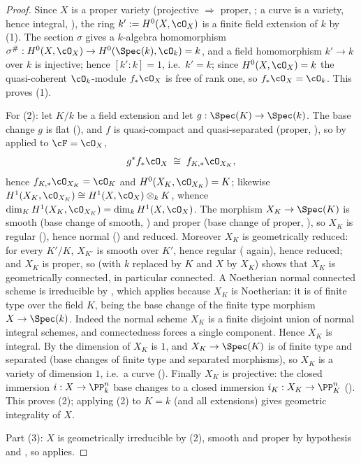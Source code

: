 \begin{proof}
Since $X$ is a proper variety (projective $\Rightarrow$ proper,
; a curve is a variety, hence integral,
), the ring $k':=H^0(X,\cO_X)$ is a finite field
extension of $k$ by  (1).  The section
$\sigma$ gives a $k$-algebra homomorphism $\sigma^\#:H^0(X,\cO_X)\to
H^0(\Spec(k),\cO_k)=k$, and a field homomorphism $k'\to k$ over $k$ is
injective; hence $[k':k]=1$, i.e.\ $k'=k$; since $H^0(X,\cO_X)=k$ the
quasi-coherent $\cO_k$-module $f_*\cO_X$ is free of rank one, so
$f_*\cO_X=\cO_k$.  This proves (1).

For (2): let $K/k$ be a field extension and let
$g:\Spec(K)\to\Spec(k)$.  The base change $g$ is flat
(), and $f$ is quasi-compact and quasi-separated
(proper, ), so by
 applied to $\cF=\cO_X$,
\[
g^*f_*\cO_X\;\cong\;f_{K,*}\cO_{X_K},
\]
hence $f_{K,*}\cO_{X_K}=\cO_K$ and $H^0(X_K,\cO_{X_K})=K$; likewise
$H^1(X_K,\cO_{X_K})\cong H^1(X,\cO_X)\otimes_kK$, whence
$\dim_K H^1(X_K,\cO_{X_K})=\dim_kH^1(X,\cO_X)$.
The morphism $X_K\to\Spec(K)$ is smooth (base change of smooth,
) and proper (base change of proper,
), so $X_K$ is regular
(), hence normal
()
and reduced.  Moreover $X_K$ is geometrically reduced: for every $K'/K$,
$X_{K'}$ is smooth over $K'$, hence regular
( again), hence reduced; and $X_K$ is
proper, so  (with $k$ replaced by $K$ and
$X$ by $X_K$) shows that $X_K$ is geometrically connected, in particular
connected.  A Noetherian normal connected scheme is irreducible by
, which applies because $X_K$ is
Noetherian: it is of finite type over the field $K$, being the base change of
the finite type morphism $X\to\Spec(k)$.  Indeed the normal scheme $X_K$ is a
finite disjoint union of normal integral schemes, and connectedness forces a
single component.  Hence $X_K$ is integral.  By 
the dimension of $X_K$ is $1$, and $X_K\to\Spec(K)$ is of finite type and
separated (base changes of finite type and separated morphisms), so $X_K$
is a variety of dimension $1$, i.e.\ a curve ().
Finally $X_K$ is projective: the closed immersion
$i:X\to\PP^n_k$ base changes to a closed immersion
$i_K:X_K\to\PP^n_K$ ().  This proves
(2); applying (2) to $K=k$ (and all extensions) gives geometric
integrality of $X$.

Part (3): $X$ is geometrically irreducible by (2), smooth and proper by
hypothesis and , so
 applies.
\end{proof}

